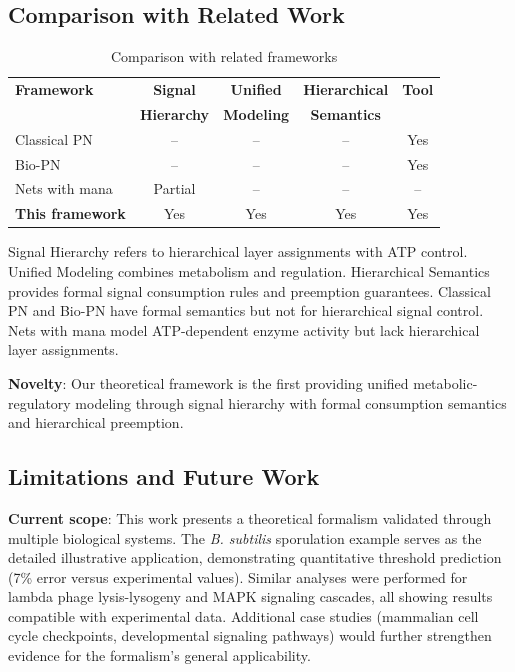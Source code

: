 \subsection{Comparison with Related Work}

\begin{table}[h]
\caption{Comparison with related frameworks}
\label{tab:comparison}
\centering
\small
\begin{tabular}{@{}lcccc@{}}
\toprule
\textbf{Framework} & \textbf{Signal} & \textbf{Unified} & \textbf{Hierarchical} & \textbf{Tool} \\
 & \textbf{Hierarchy} & \textbf{Modeling} & \textbf{Semantics} &  \\
\midrule
Classical PN~\cite{murata1989} & -- & -- & -- & Yes \\
Bio-PN~\cite{heiner2008} & -- & -- & -- & Yes \\
Nets with mana~\cite{genovese2021} & Partial & -- & -- & -- \\
\textbf{This framework} & Yes & Yes & Yes & Yes \\
\bottomrule
\end{tabular}
\end{table}

\vspace{3pt}
\noindent Signal Hierarchy refers to hierarchical layer assignments with ATP control. Unified Modeling combines metabolism and regulation. Hierarchical Semantics provides formal signal consumption rules and preemption guarantees. Classical PN and Bio-PN have formal semantics but not for hierarchical signal control. Nets with mana model ATP-dependent enzyme activity but lack hierarchical layer assignments.

\vspace{3pt}
\noindent\textbf{Novelty}: Our theoretical framework is the first providing unified metabolic-regulatory modeling through signal hierarchy with formal consumption semantics and hierarchical preemption.

\subsection{Limitations and Future Work}

\vspace{3pt}
\noindent\textbf{Current scope}: This work presents a theoretical formalism validated through multiple biological systems. The \textit{B. subtilis} sporulation example serves as the detailed illustrative application, demonstrating quantitative threshold prediction (7\% error versus experimental values). Similar analyses were performed for lambda phage lysis-lysogeny and MAPK signaling cascades, all showing results compatible with experimental data. Additional case studies (mammalian cell cycle checkpoints, developmental signaling pathways) would further strengthen evidence for the formalism's general applicability.

